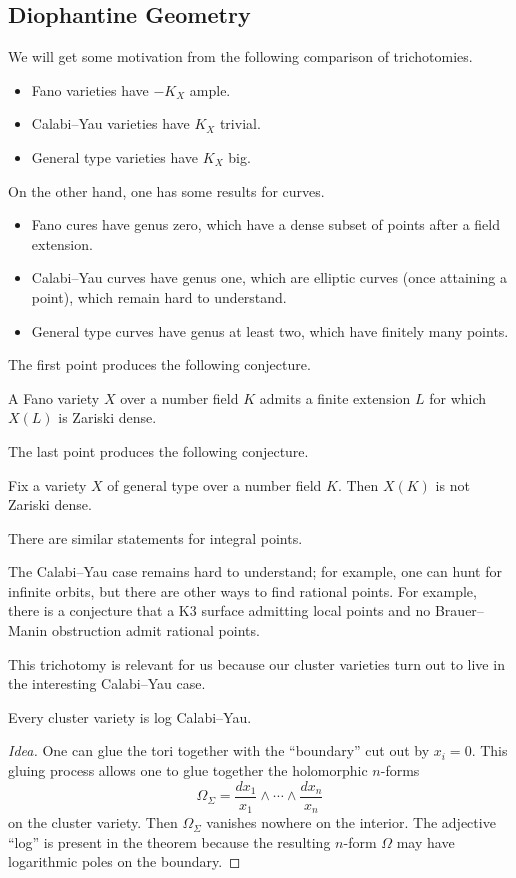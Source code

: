\documentclass[../notes.tex]{subfiles}
\begin{document}
\subsection{Diophantine Geometry}
We will get some motivation from the following comparison of trichotomies.
\begin{itemize}
	\item Fano varieties have $-K_X$ ample.
	\item Calabi--Yau varieties have $K_X$ trivial.
	\item General type varieties have $K_X$ big.
\end{itemize}
On the other hand, one has some results for curves.
\begin{itemize}
	\item Fano cures have genus zero, which have a dense subset of points after a field extension.
	\item Calabi--Yau curves have genus one, which are elliptic curves (once attaining a point), which remain hard to understand.
	\item General type curves have genus at least two, which have finitely many points.
\end{itemize}
The first point produces the following conjecture.
\begin{conj}[Campana]
	A Fano variety $X$ over a number field $K$ admits a finite extension $L$ for which $X(L)$ is Zariski dense.
\end{conj}
The last point produces the following conjecture.
\begin{conj}
	Fix a variety $X$ of general type over a number field $K$. Then $X(K)$ is not Zariski dense.
\end{conj}
\begin{remark}
	There are similar statements for integral points.
\end{remark}
The Calabi--Yau case remains hard to understand; for example, one can hunt for infinite orbits, but there are other ways to find rational points. For example, there is a conjecture that a K3 surface admitting local points and no Brauer--Manin obstruction admit rational points.

This trichotomy is relevant for us because our cluster varieties turn out to live in the interesting Calabi--Yau case.
\begin{theorem}
	Every cluster variety is log Calabi--Yau.
\end{theorem}
\begin{proof}[Idea]
	One can glue the tori together with the ``boundary'' cut out by $x_i=0$. This gluing process allows one to glue together the holomorphic $n$-forms
	\[\Omega_\Sigma=\frac{dx_1}{x_1}\land\cdots\land\frac{dx_n}{x_n}\]
	on the cluster variety. Then $\Omega_\Sigma$ vanishes nowhere on the interior. The adjective ``log'' is present in the theorem because the resulting $n$-form $\Omega$ may have logarithmic poles on the boundary.
\end{proof}
\end{document}
